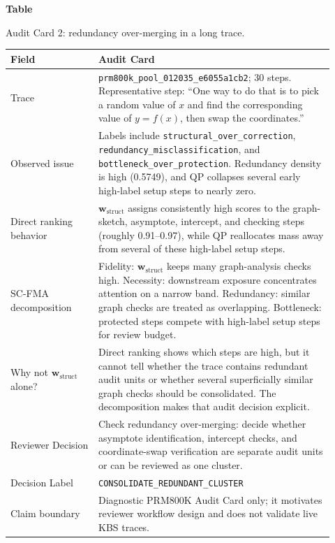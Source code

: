 \documentclass[a4paper,fleqn]{cas-sc}
\newcommand{\wstruct}{\ensuremath{\mathbf{w}_{\mathrm{struct}}}}
\begin{document}
\clearpage
\par\medskip
{}\label{tab:audit-card-redundancy}
\noindent\textbf{Table~\thetable}\par
\noindent Audit Card 2: redundancy over-merging in a long trace.
\begin{center}
\small
\renewcommand{\arraystretch}{1.08}
\begin{tabular}{p{0.25\linewidth}p{0.67\linewidth}}
\toprule
\textbf{Field} & \textbf{Audit Card} \\
\midrule
Trace & \texttt{prm800k\_pool\_012035\_e6055a1cb2}; 30 steps. Representative step: ``One way to do that is to pick a random value of $x$ and find the corresponding value of $y=f(x)$, then swap the coordinates.'' \\
Observed issue & Labels include \texttt{structural\_over\_correction}, \texttt{redundancy\_misclassification}, and \texttt{bottleneck\_over\_protection}. Redundancy density is high (0.5749), and QP collapses several early high-label setup steps to nearly zero. \\
Direct ranking behavior & \wstruct{} assigns consistently high scores to the graph-sketch, asymptote, intercept, and checking steps (roughly 0.91--0.97), while QP reallocates mass away from several of these high-label setup steps. \\
SC-FMA decomposition & Fidelity: \wstruct{} keeps many graph-analysis checks high. Necessity: downstream exposure concentrates attention on a narrow band. Redundancy: similar graph checks are treated as overlapping. Bottleneck: protected steps compete with high-label setup steps for review budget. \\
Why not \wstruct{} alone? & Direct ranking shows which steps are high, but it cannot tell whether the trace contains redundant audit units or whether several superficially similar graph checks should be consolidated. The decomposition makes that audit decision explicit. \\
Reviewer Decision & Check redundancy over-merging: decide whether asymptote identification, intercept checks, and coordinate-swap verification are separate audit units or can be reviewed as one cluster. \\
Decision Label & \texttt{CONSOLIDATE\_REDUNDANT\_CLUSTER} \\
Claim boundary & Diagnostic PRM800K Audit Card only; it motivates reviewer workflow design and does not validate live KBS traces. \\
\bottomrule
\end{tabular}
\end{center}
\medskip
\end{document}
